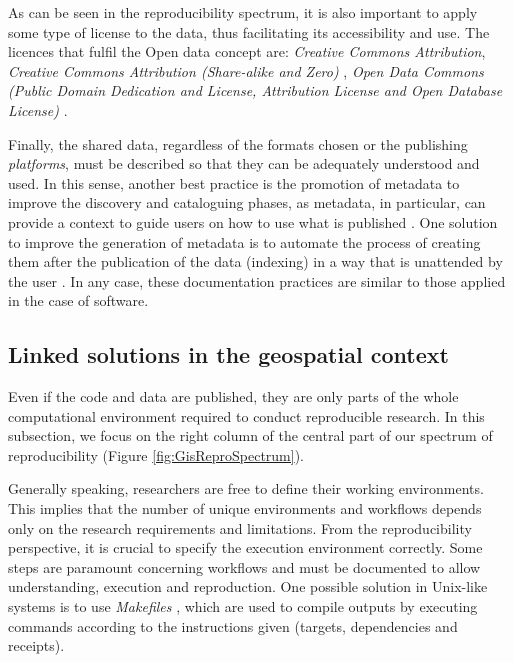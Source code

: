 \documentclass[ijgi,article,submit,moreauthors,pdftex]{Definitions/mdpi}
\begin{document}
As can be seen in the reproducibility spectrum, it is also important to apply some type of license to the data, thus facilitating its accessibility and use. The licences that fulfil the Open data concept are: \textit{Creative Commons Attribution}, \textit{Creative Commons Attribution (Share-alike and Zero)} \cite{cc}, \textit{Open Data Commons (Public Domain Dedication and License, Attribution License and Open Database License)} \cite{opendatacommons}.

Finally, the shared data, regardless of the formats chosen or the publishing \textit{platforms}, must be described so that they can be adequately understood and used. In this sense, another best practice is the promotion of metadata to improve the discovery and cataloguing phases, as metadata, in particular, can provide a context to guide users on how to use what is published \cite{benitez2018roadblocks}. One solution to improve the generation of metadata is to automate the process of creating them after the publication of the data (indexing) in a way that is unattended by the user \cite{trilles2017approach}. In any case, these documentation practices are similar to those applied in the case of software.


\subsection{Linked solutions in the geospatial context}
\label{sec:containerization}

Even if the code and data are published, they are only parts of the whole computational environment required to conduct reproducible research. In this subsection, we focus on the right column of the central part of our spectrum of reproducibility (Figure \ref{fig:GisReproSpectrum}).

Generally speaking, researchers are free to define their working environments. This implies that the number of unique environments and workflows depends only on the research requirements and limitations. From the reproducibility perspective, it is crucial to specify the execution environment correctly. Some steps are paramount concerning workflows and must be documented to allow understanding, execution and reproduction. One possible solution in Unix-like systems is to use \textit{Makefiles} \cite{mecklenburg2004managing}, which are used to compile outputs by executing commands according to the instructions given (targets, dependencies and receipts).
\end{document}
